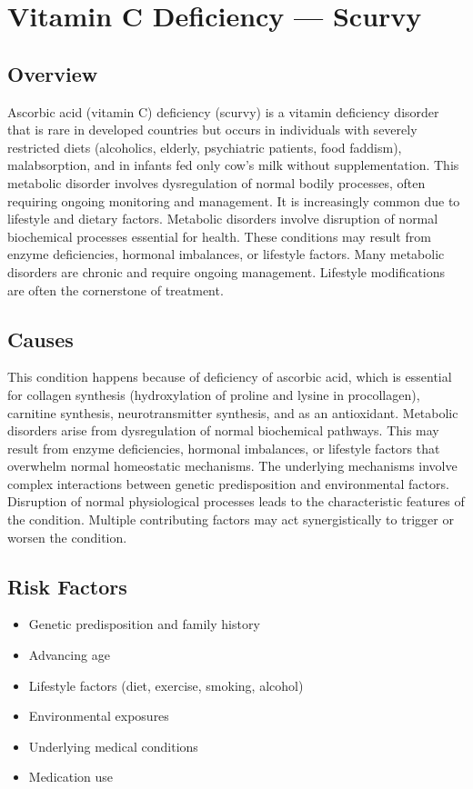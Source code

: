 \chapter{Vitamin C Deficiency --- Scurvy}
\label{sec:Vitamin C Deficiency}

\section{Overview}
Ascorbic acid (vitamin C) deficiency (scurvy) is a vitamin deficiency disorder that is rare in developed countries but occurs in individuals with severely restricted diets (alcoholics, elderly, psychiatric patients, food faddism), malabsorption, and in infants fed only cow's milk without supplementation. This metabolic disorder involves dysregulation of normal bodily processes, often requiring ongoing monitoring and management. It is increasingly common due to lifestyle and dietary factors. Metabolic disorders involve disruption of normal biochemical processes essential for health. These conditions may result from enzyme deficiencies, hormonal imbalances, or lifestyle factors. Many metabolic disorders are chronic and require ongoing management. Lifestyle modifications are often the cornerstone of treatment.
\section{Causes}
This condition happens because of deficiency of ascorbic acid, which is essential for collagen synthesis (hydroxylation of proline and lysine in procollagen), carnitine synthesis, neurotransmitter synthesis, and as an antioxidant. Metabolic disorders arise from dysregulation of normal biochemical pathways. This may result from enzyme deficiencies, hormonal imbalances, or lifestyle factors that overwhelm normal homeostatic mechanisms. The underlying mechanisms involve complex interactions between genetic predisposition and environmental factors. Disruption of normal physiological processes leads to the characteristic features of the condition. Multiple contributing factors may act synergistically to trigger or worsen the condition.
\section{Risk Factors}
\begin{itemize}[noitemsep]
  \item Genetic predisposition and family history
  \item Advancing age
  \item Lifestyle factors (diet, exercise, smoking, alcohol)
  \item Environmental exposures
  \item Underlying medical conditions
  \item Medication use
\end{itemize}
